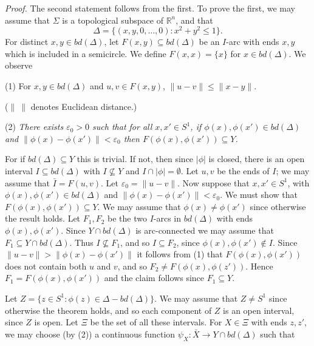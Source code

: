\textit{Proof.} The second statement follows from the first. To prove the first, we may assume that $\Sigma$ is a topological subspace of $\mathbb{R}^n$, and that
\begin{equation*}
\Delta = \{(x, y, 0, \dots, 0) \colon x^2 + y^2 \le 1\}.
\end{equation*}
For distinct $x, y \in bd(\Delta)$, let $F(x, y) \subseteq bd(\Delta)$ be an $I$-arc with ends $x, y$ which is included in a semicircle. We define $F(x, x) = \{x\}$ for $x \in bd(\Delta)$. We observe

\hspace*{12pt}(1) For $x, y \in bd(\Delta)$ and $u, v \in F(x, y)$, $\|u - v\| \le \|x - y\|$.

($\|\ \|$ denotes Euclidean distance.)

\hspace*{12pt}(2) \textit{There exists $\varepsilon_0 > 0$ such that for all $x, x' \in S^1$, if $\phi(x), \phi(x') \in bd(\Delta)$ and $\|\phi(x) - \phi(x')\| < \varepsilon_0$ then $F(\phi(x), \phi(x')) \subseteq Y$.}

For if $bd(\Delta) \subseteq Y$ this is trivial. If not, then since $|\phi|$ is closed, there is an open interval $I \subseteq bd(\Delta)$ with $I \nsubseteq Y$ and $I \cap |\phi| = \emptyset$. Let $u, v$ be the ends of $I$; we may assume that $\bar{I} = F(u, v)$. Let $\varepsilon_0 = \|u - v\|$. Now suppose that $x, x' \in S^1$, with $\phi(x), \phi(x') \in bd(\Delta)$ and $\|\phi(x) - \phi(x')\| < \varepsilon_0$. We must show that $F(\phi(x), \phi(x')) \subseteq Y$. We may assume that $\phi(x) \ne \phi(x')$ since otherwise the result holds. Let $F_1, F_2$ be the two $I$-arcs in $bd(\Delta)$ with ends $\phi(x), \phi(x')$. Since $Y \cap bd(\Delta)$ is arc-connected we may assume that $F_1 \subseteq Y \cap bd(\Delta)$. Thus $I \nsubseteq F_1$, and so $I \subseteq F_2$, since $\phi(x), \phi(x') \notin I$. Since $\|u - v\| > \|\phi(x) - \phi(x')\|$ it follows from (1) that $F(\phi(x), \phi(x'))$ does not contain both $u$ and $v$, and so $F_2 \ne F(\phi(x), \phi(z'))$. Hence $F_1 = F(\phi(x), \phi(x'))$ and the claim follows since $F_1 \subseteq Y$.

Let $Z = \{z \in S^1 \colon \phi(z) \in \Delta - bd(\Delta)\}$. We may assume that $Z \ne S^1$ since otherwise the theorem holds, and so each component of $Z$ is an open interval, since $Z$ is open. Let $\Xi$ be the set of all these intervals. For $X \in \Xi$ with ends $z, z'$, we may choose (by (2)) a continuous function $\psi_X \colon \bar{X} \to Y \cap bd(\Delta)$ such that

